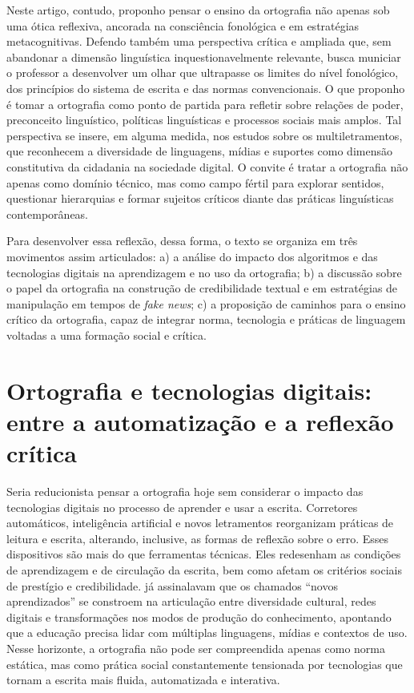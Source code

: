 \documentclass[portuguese]{textolivre}
\begin{document}
Neste artigo, contudo, proponho pensar o ensino da ortografia não apenas sob uma ótica reflexiva, ancorada na consciência fonológica e em estratégias metacognitivas. Defendo também uma perspectiva crítica e ampliada que, sem abandonar a dimensão linguística inquestionavelmente relevante, busca municiar o professor a desenvolver um olhar que ultrapasse os limites do nível fonológico, dos princípios do sistema de escrita e das normas convencionais. O que proponho é tomar a ortografia como ponto de partida para refletir sobre relações de poder, preconceito linguístico, políticas linguísticas e processos sociais mais amplos. Tal perspectiva se insere, em alguma medida, nos estudos sobre os multiletramentos, que reconhecem a diversidade de linguagens, mídias e suportes como dimensão constitutiva da cidadania na sociedade digital. O convite é tratar a ortografia não apenas como domínio técnico, mas como campo fértil para explorar sentidos, questionar hierarquias e formar sujeitos críticos diante das práticas linguísticas contemporâneas.

Para desenvolver essa reflexão, dessa forma, o texto se organiza em três movimentos assim articulados: a) a análise do impacto dos algoritmos e das tecnologias digitais na aprendizagem e no uso da ortografia; b) a discussão sobre o papel da ortografia na construção de credibilidade textual e em estratégias de manipulação em tempos de \textit{fake news}; c) a proposição de caminhos para o ensino crítico da ortografia, capaz de integrar norma, tecnologia e práticas de linguagem voltadas a uma formação social e crítica.

\section{Ortografia e tecnologias digitais: entre a automatização e a reflexão crítica}\label{sec-normas}
Seria reducionista pensar a ortografia hoje sem considerar o impacto das tecnologias digitais no processo de aprender e usar a escrita. Corretores automáticos, inteligência artificial e novos letramentos reorganizam práticas de leitura e escrita, alterando, inclusive, as formas de reflexão sobre o erro. Esses dispositivos são mais do que ferramentas técnicas. Eles redesenham as condições de aprendizagem e de circulação da escrita, bem como afetam os critérios sociais de prestígio e credibilidade. \textcite{kalantzis2005learning} já assinalavam que os chamados “novos aprendizados” se constroem na articulação entre diversidade cultural, redes digitais e transformações nos modos de produção do conhecimento, apontando que a educação precisa lidar com múltiplas linguagens, mídias e contextos de uso. Nesse horizonte, a ortografia não pode ser compreendida apenas como norma estática, mas como prática social constantemente tensionada por tecnologias que tornam a escrita mais fluida, automatizada e interativa.
\end{document}
